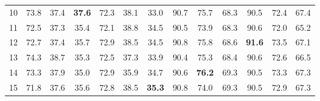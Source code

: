 \begin{table}[t]
{\begin{tabular}{c c c c| c c c| c c c| c c c}
            10 & 73.8 & 37.4 & \textbf{37.6} & 72.3 & 38.1 & 33.0 & 90.7 & 75.7 & 68.3 & 90.5 & 72.4 & 67.4 \\
            11 & 72.5 & 37.3 & 35.4 & 72.1 & 38.8 & 34.5 & 90.5 & 73.9 & 68.3 & 90.6 & 72.0 & 65.2 \\
            12 & 72.7 & 37.4 & 35.7 & 72.9 & 38.5 & 34.5 & 90.8 & 75.8 & 68.6 & \textbf{91.6} & 73.5 & 67.1 \\
            13 & 74.3 & 38.7 & 35.3 & 72.5 & 37.3 & 33.9 & 90.4 & 75.3 & 68.4 & 90.6 & 72.6 & 66.5 \\
            14 & 73.3 & 37.9 & 35.0 & 72.9 & 35.9 & 34.7 & 90.6 & \textbf{76.2} & 69.3 & 90.5 & 73.3 & 67.3 \\
            15 & 71.8 & 37.6 & 35.6 & 72.8 & 38.5 & \textbf{35.3} & 90.8 & 74.0 & 69.3 & 90.5 & 72.9 & 67.3 \\
                                  
        \bottomrule
    \end{tabular}
    }
    \label{tab:fine_tuning_distal_intermediate}
\end{table}

